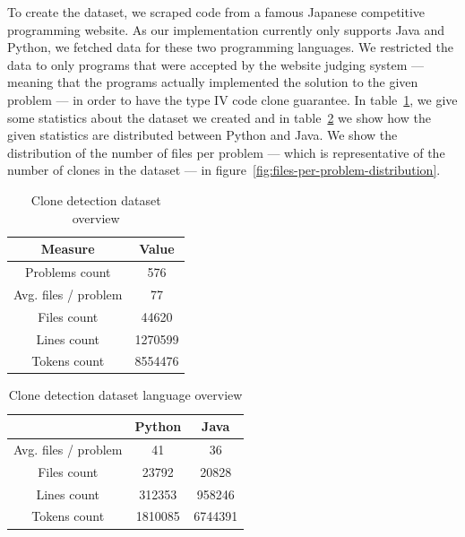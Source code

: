 To create the dataset, we scraped code from a famous Japanese competitive
programming website. As our implementation currently only supports Java and
Python, we fetched data for these two programming languages. We restricted the
data to only programs that were accepted by the website judging system --- meaning
that the programs actually implemented the solution to the given problem --- in
order to have the type IV code clone guarantee. In
table~\ref{tab:clone-dataset-overview}, we give some statistics about the
dataset we created and in table~\ref{tab:clone-dataset-languages} we show how
the given statistics are distributed between Python and Java. We show the
distribution of the number of files per problem --- which is representative of
the number of clones in the dataset --- in
figure~\ref{fig:files-per-problem-distribution}.

\begin{table}
  \caption{\label{tab:clone-dataset-overview} Clone detection dataset overview}
  \begin{center}
    \begin{tabular}{c c}
      Measure & Value\\
      \toprule
      Problems count & 576\\
      Avg. files / problem & 77\\
      Files count & 44620\\
      Lines count & 1270599\\
      Tokens count & 8554476
    \end{tabular}
  \end{center}
\end{table}

\begin{table}
  \caption{\label{tab:clone-dataset-languages} Clone detection dataset language overview}
  \begin{center}
    \begin{tabular}{c c c}
      & Python & Java\\
      \toprule
      Avg. files / problem & 41 & 36\\
      Files count & 23792 & 20828\\
      Lines count & 312353 & 958246\\
      Tokens count & 1810085 & 6744391
    \end{tabular}
  \end{center}
\end{table}

